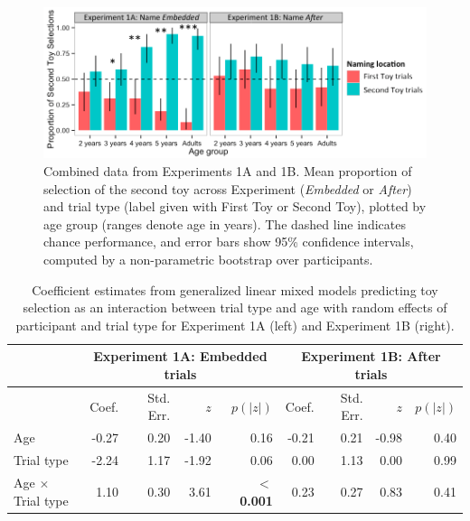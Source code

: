 \documentclass[man]{apa2}
\begin{document}
\begin{figure}
  \begin{center} 
    \includegraphics[width=6in]{figures/continuity_kids_and_adults_barplot_asterisks.png} 
    \caption{\label{fig:res5} Combined data from Experiments 1A and 1B.  Mean proportion of selection of the second toy across Experiment (\emph{Embedded} or \emph{After}) and trial type (label given with First Toy or Second Toy), plotted by age group (ranges denote age in years). The dashed line indicates chance performance, and error bars show 95\% confidence intervals, computed by a non-parametric bootstrap over participants.} 
  \end{center} 
\end{figure}	



  \begin{table} [t]
   \caption{Coefficient estimates from generalized linear mixed models predicting toy selection as an interaction between trial type and age with random effects of participant and trial type for Experiment 1A (left) and Experiment 1B (right).
   \label{tab:coefficient_estimates} } 
   \begin{center} 
     \begin{tabular}{lrrrr|rrrr} 
          & \multicolumn{4}{c}{Experiment 1A: Embedded trials} &  \multicolumn{4}{c}{Experiment 1B: After trials}\\
                      \hline 
       \null  & Coef. & Std. Err. & $z$  &  $p(|z|)$ & Coef. & Std. Err. & $z$  &  $p(|z|)$  \\ 
       \hline  
        Age   & -0.27 	&  0.20 & -1.40 & 0.16						               & -0.21 & 0.21 & -0.98 & 0.40\\ 
        Trial type   & -2.24 & 1.17 &  -1.92 & 0.06				                       & 0.00 & 1.13 & 0.00 & 0.99 \\
        Age $\times$ Trial type    & 1.10 & 0.30 & 3.61 &\textbf{ $<$0.001} 		& 0.23 & 0.27 & 0.83 & 0.41\\ 
       \hline 
     \end{tabular} 
  \end{center}
 \end{table}
 
\end{document}
